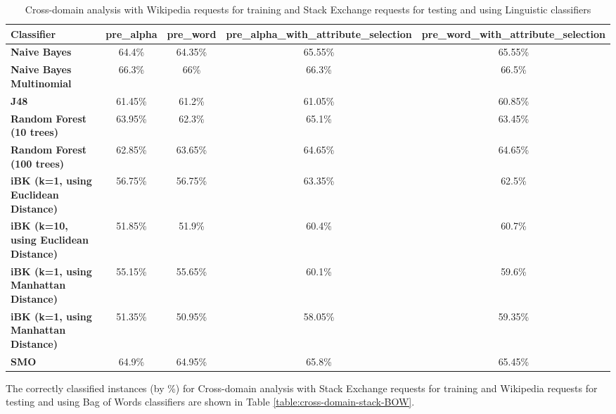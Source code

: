\documentclass[conference]{IEEEtran}
\begin{document}
\begin{table*}[htbp]
\caption{Cross-domain analysis with Wikipedia requests for training and Stack Exchange requests for testing and using Linguistic classifiers }
\centering
\vspace{5pt}
\begin{tabular}{|l|c|c|c|c|}
\hline
\textbf{Classifier} & \textbf{pre\_alpha} & \textbf{pre\_word} & \textbf{pre\_alpha\_with\_attribute\_selection} & \textbf{pre\_word\_with\_attribute\_selection} \\
\hline\hline
\textbf{Naive Bayes} & 64.4\% & 64.35\% & 65.55\% & 65.55\% \\ 
\hline
\textbf{Naive Bayes Multinomial} & 66.3\% & 66\% & 66.3\% & 66.5\% \\ 
\hline
\textbf{J48} & 61.45\% & 61.2\% & 61.05\% & 60.85\% \\ 
\hline
\textbf{Random Forest (10 trees)} & 63.95\% & 62.3\% & 65.1\% & 63.45\% \\ 
\hline
\textbf{Random Forest (100 trees)} & 62.85\% & 63.65\% & 64.65\% & 64.65\% \\ 
\hline
\textbf{iBK (k=1, using Euclidean Distance)} & 56.75\% & 56.75\% & 63.35\% & 62.5\% \\ 
\hline
\textbf{iBK (k=10, using Euclidean Distance)} & 51.85\% & 51.9\% & 60.4\% & 60.7\% \\ 
\hline
\textbf{iBK (k=1, using Manhattan Distance)} & 55.15\% & 55.65\% & 60.1\% & 59.6\% \\ 
\hline
\textbf{iBK (k=1, using Manhattan Distance)} & 51.35\% & 50.95\% & 58.05\% & 59.35\% \\ 
\hline
\textbf{SMO} & 64.9\% & 64.95\% & 65.8\% & 65.45\% \\ 
\hline
\hline
\end{tabular}
\label{table:cross-domain-wiki-Ling}
\end{table*}

The correctly classified instances (by \%) for Cross-domain analysis with Stack Exchange requests for training and Wikipedia requests for testing and using Bag of Words classifiers are shown in Table \ref{table:cross-domain-stack-BOW}.
\end{document}
